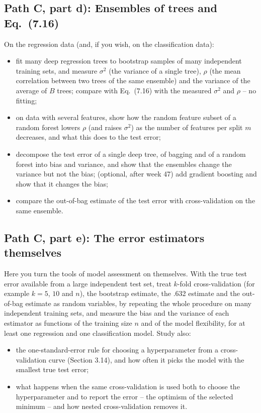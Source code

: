 \documentclass[11pt,a4paper]{article}
\begin{document}
\subsection*{Path C, part d): Ensembles of trees and Eq.\ (7.16)}

On the regression data (and, if you wish, on the classification data):
\begin{itemize}[nosep]
  \item fit many deep regression trees to bootstrap samples of many
        independent training sets, and measure $\sigma^2$ (the variance of a
        single tree), $\rho$ (the mean correlation between two trees of the
        same ensemble) and the variance of the average of $B$ trees; compare
        with Eq.\ (7.16) with the measured $\sigma^2$ and $\rho$ -- no fitting;
  \item on data with several features, show how the random feature subset of
        a random forest lowers $\rho$ (and raises $\sigma^2$) as the number
        of features per split $m$ decreases, and what this does to the test
        error;
  \item decompose the test error of a single deep tree, of bagging and of a
        random forest into bias and variance, and show that the ensembles
        change the variance but not the bias; (optional, after week 47)
        add gradient boosting and show that it changes the bias;
  \item compare the out-of-bag estimate of the test error with
        cross-validation on the same ensemble.
\end{itemize}

\subsection*{Path C, part e): The error estimators themselves}

Here you turn the tools of model assessment on themselves.  With the true
test error available from a large independent test set, treat $k$-fold
cross-validation (for example $k=5$, $10$ and $n$), the bootstrap estimate,
the .632 estimate and the out-of-bag estimate as random variables, by
repeating the whole procedure on many independent training sets, and
measure the bias and the variance of each estimator as functions of the
training size $n$ and of the model flexibility, for at least one regression
and one classification model.  Study also:
\begin{itemize}[nosep]
  \item the one-standard-error rule for choosing a hyperparameter from a
        cross-validation curve (Section 3.14), and how often it picks the
        model with the smallest true test error;
  \item what happens when the same cross-validation is used both to choose
        the hyperparameter and to report the error -- the optimism of the
        selected minimum -- and how nested cross-validation removes it.
\end{itemize}
\end{document}

